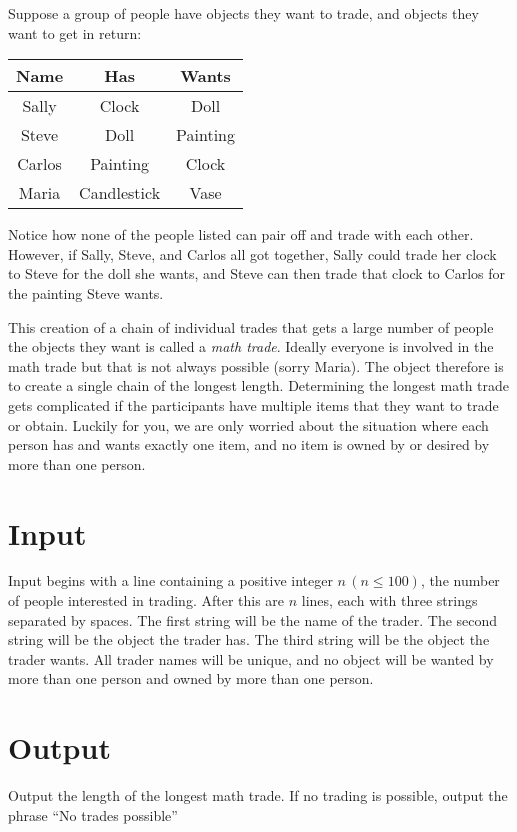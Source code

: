 
Suppose a group of people have objects they want to trade, and objects they want to get in return:

\begin{center}
\begin {tabular} {c c c}
  Name & Has & Wants \\ \hline
  Sally & Clock & Doll \\
  Steve & Doll & Painting \\
  Carlos & Painting & Clock \\
  Maria & Candlestick & Vase \\ \hline
\end {tabular}
\end{center}
Notice how none of the people listed can pair off and trade with each other.  However, if Sally, Steve, and Carlos all got together, Sally could trade her clock to Steve for the doll she wants, and Steve can then trade that clock to Carlos for the painting Steve wants.

This creation of a chain of individual trades that gets a large number of people the objects they want is called a {\em math trade}. Ideally everyone is involved in the math trade but that is not always possible (sorry Maria). The object therefore is to create a single chain of the longest length. Determining the longest math trade gets complicated if the participants have multiple items that they want to trade or obtain.  Luckily for you, we are only worried about the situation where each person has and wants exactly one item, and no item is owned by or desired by more than one person.

\section*{Input}

Input begins with a line containing a positive integer $n\,(n \leq 100)$, the number of people interested in trading.  After this are $n$ lines, each with three strings separated by spaces.  The first string will be the name of the trader.  The second string will be the object the trader has.  The third string will be the object the trader wants.  All trader names will be unique, and no object will be wanted by more than one person and owned by more than one person.

\section*{Output}
Output the length of the longest math trade.  If no trading is possible, output the phrase ``No trades possible''


